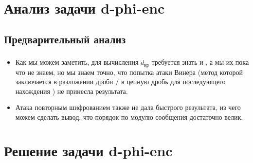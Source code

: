 \documentclass[t]{beamer}
\begin{document}
\section{Анализ задачи d-phi-enc}
\subsection{Предварительный анализ}
\begin{frame}
	\frametitle{\insertsection}
	\framesubtitle{\insertsubsection}
    \begin{itemize}
        \item Как мы можем заметить, для вычисления $d_{кр}$ требуется знать  и , а мы их пока что не знаем, но мы знаем точно, что попытка атаки Винера (метод которой заключается в разложении дроби / в цепную дробь для последующего нахождения ) не принесла результата.\newline
        \item Атака повторным шифрованием также не дала быстрого результата, из чего можем сделать вывод, что порядок  по модулю сообщения достаточно велик.
    \end{itemize}
\end{frame}

\section{Решение задачи d-phi-enc}
\end{document}
